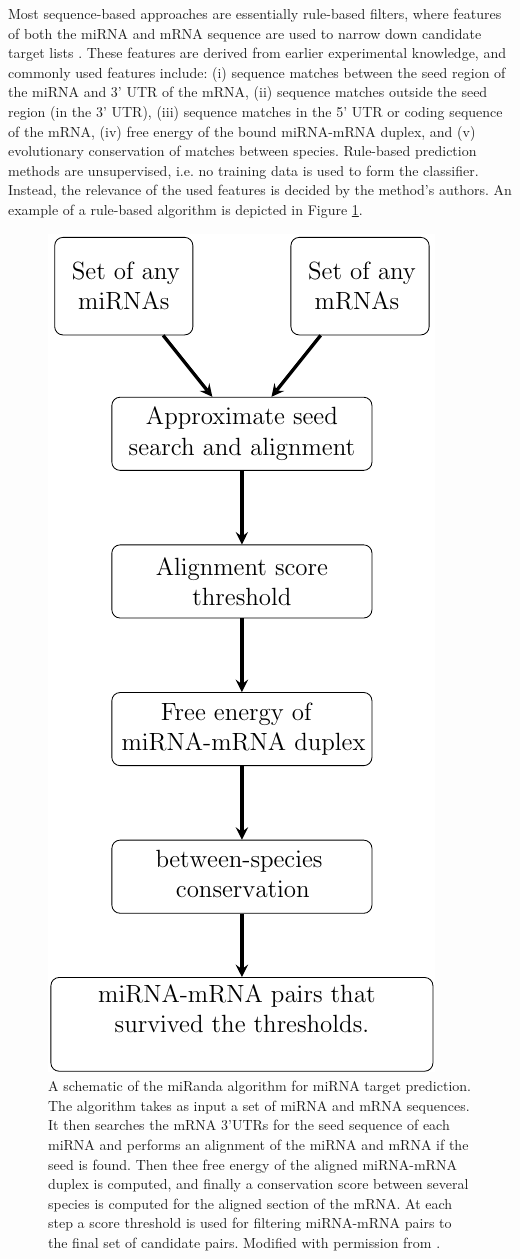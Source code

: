 Most sequence-based approaches are essentially rule-based filters, where
features of both the miRNA and mRNA sequence are used to narrow down candidate
target lists \citep{Yue2009}. These features are derived from earlier
experimental knowledge, and commonly used features include:
(i) sequence matches between the seed region of the miRNA and 3' UTR of the mRNA,
(ii) sequence matches outside the seed region (in the 3' UTR),
(iii) sequence matches in the 5' UTR or coding sequence of the mRNA,
(iv) free energy of the bound miRNA-mRNA duplex, and
(v) evolutionary conservation of matches between species.
Rule-based prediction methods are unsupervised, i.e. no training data is
used to form the classifier. Instead, the relevance of the used features is
decided by the method's authors. An example of a rule-based algorithm
is depicted in Figure \ref{fig:miranda-flow}.

\begin{figure}[htb]
  \centering
  \includegraphics[width=0.3\linewidth]{figures/miRanda-flow.pdf}
  \caption{A schematic of the miRanda \citep{Betel2008} algorithm for
  miRNA target prediction. The algorithm takes as input a set of miRNA
  and mRNA sequences. It then searches the mRNA 3'UTRs for the seed sequence
  of each miRNA and performs an alignment of the miRNA and mRNA if the seed is found.
  Then thee free energy of the aligned miRNA-mRNA duplex is computed, and
  finally a conservation score between several species is computed for the
  aligned section of the mRNA. At each step a score threshold is used for
  filtering miRNA-mRNA pairs to the final set of candidate pairs.
  Modified with permission from \citep{Karhu2009}.}
  \label{fig:miranda-flow}
\end{figure}


